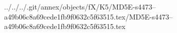 ../../../.git/annex/objects/fX/K5/MD5E-s4473--a49b06c8a69cede1fb9f0632c5f63515.tex/MD5E-s4473--a49b06c8a69cede1fb9f0632c5f63515.tex